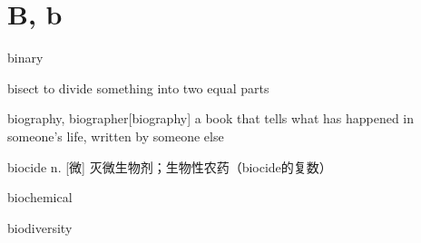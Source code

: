 \section{B, b}

\begin{DefWord}{binary}
\end{DefWord}

\begin{DefWord}{bisect}
    to divide something into two equal parts
\end{DefWord}

\begin{DefWord}{biography, biographer}[biography]
    a book that tells what has happened in someone's life, written by someone else
\end{DefWord}

\begin{DefWord}{biocide}
    n. [微] 灭微生物剂；生物性农药（biocide的复数）
\end{DefWord}

\begin{DefWord}{biochemical}
\end{DefWord}

\begin{DefWord}{biodiversity}
\end{DefWord}